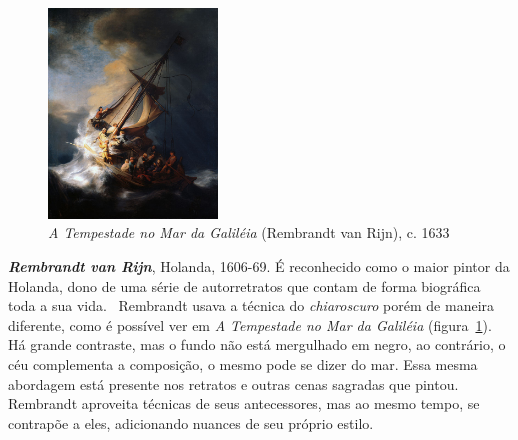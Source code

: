 \begin{figure}
  \begin{centering}
   \caption{\emph{A Tempestade no Mar da Galiléia} (Rembrandt van Rijn), c. 1633}
   \label{fig:rembrandt:tempestade}
    \includegraphics[width=0.4\textwidth]{figs/rembrandt_tempestade.png}
  \end{centering}
\end{figure}

\textbf{\emph{Rembrandt van Rijn}}, Holanda, 1606-69. É reconhecido
como o maior pintor da Holanda, dono de uma série de autorretratos que
contam de forma biográfica toda a sua vida.~\cite{van1999,
gombrich} Rembrandt usava a técnica do \textit{chiaroscuro} porém de
maneira diferente, como é possível ver em \textit{A Tempestade no Mar
da Galiléia} (figura~\ref{fig:rembrandt:tempestade}). Há grande
contraste, mas o fundo não está mergulhado em negro, ao contrário, o
céu complementa a composição, o mesmo pode se dizer do mar. Essa mesma
abordagem está presente nos retratos e outras cenas sagradas que
pintou.~\cite{van1997} Rembrandt
aproveita técnicas de seus antecessores, mas ao mesmo tempo, se
contrapõe a eles, adicionando nuances de seu próprio estilo.

